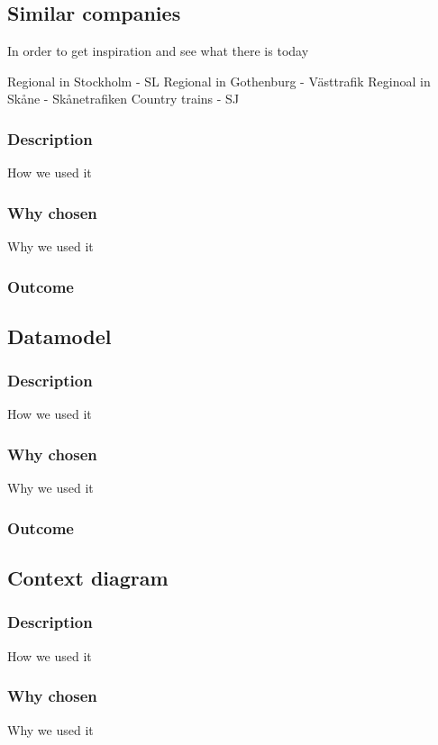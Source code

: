 \documentclass[a4paper]{article}
\begin{document}
    \subsection{Similar companies}
    In order to get inspiration and see what there is today
	
    Regional in Stockholm - SL
    Regional in Gothenburg - Västtrafik
    Reginoal in Skåne - Skånetrafiken
    Country trains - SJ
    
    \subsubsection{Description}
    How we used it
    \subsubsection{Why chosen}
    Why we used it
    \subsubsection{Outcome}
    

    \subsection{Datamodel}

    \subsubsection{Description}
    How we used it
    \subsubsection{Why chosen}
    Why we used it
    \subsubsection{Outcome}

    \subsection{Context diagram}


    \subsubsection{Description}
    How we used it
    \subsubsection{Why chosen}
    Why we used it
\end{document}
